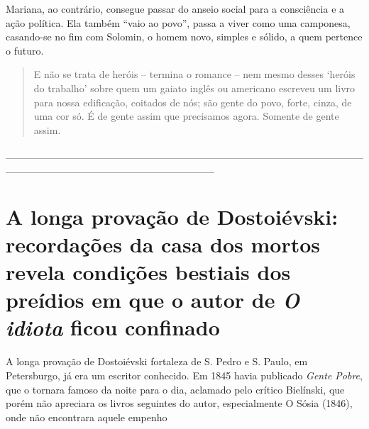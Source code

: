 Mariana, ao contrário, consegue passar do anseio social para a
consciência e a ação política. Ela também ``vaio ao povo'', passa a
viver como uma camponesa, casando-se no fim com Solomin, o homem novo,
simples e sólido, a quem pertence o futuro.

\begin{quote}
E não se trata de heróis -- termina o romance -- nem mesmo desses
`heróis do trabalho' sobre quem um gaiato inglês ou americano escreveu
um livro para nossa edificação, coitados de nós; são gente do povo,
forte, cinza, de uma cor só. É de gente assim que precisamos agora.
Somente de gente assim.
\end{quote}

\_\_\_\_\_\_\_\_\_\_\_\_\_\_\_\_\_\_\_\_\_\_\_\_\_\_\_\_\_\_\_\_\_\_\_\_\_\_\_\_\_\_\_\_\_\_\_\_\_\_\_\_\_\_\_\_\_\_\_\_\_\_\_\_\_\_\_\_\_\_\_\_\_\_\_\_

\chapter{A longa provação de Dostoiévski: recordações da casa dos mortos revela condições bestiais dos preídios em que o autor de \emph{O
idiota} ficou confinado}

A longa provação de Dostoiévski fortaleza de S. Pedro e S. Paulo, em
Petersburgo, já era um escritor conhecido. Em 1845 havia publicado
\emph{Gente Pobre}, que o tornara famoso da noite para o dia, aclamado
pelo crítico Bielínski, que porém não apreciara os livros seguintes do
autor, especialmente O Sósia (1846), onde não encontrara aquele empenho

